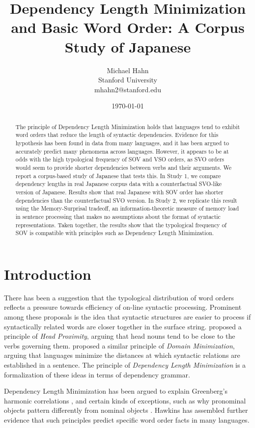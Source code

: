 \documentclass[11pt,a4paper]{article}
\title{Dependency Length Minimization and Basic Word Order: A Corpus Study of Japanese}
\author{Michael Hahn \\ Stanford University \\ mhahn2@stanford.edu}
\date{\today}
\begin{document}
\maketitle
\begin{abstract}
The principle of Dependency Length Minimization holds that languages tend to exhibit word orders that reduce the length of syntactic dependencies.
Evidence for this hypothesis has been found in data from many languages, and it has been argued to accurately predict many phenomena across languages.
However, it appears to be at odds with the high typological frequency of SOV and VSO orders, as SVO orders would seem to provide shorter dependencies between verbs and their arguments.
We report a corpus-based study of Japanese that tests this.
In Study 1, we compare dependency lengths in real Japanese corpus data with a counterfactual SVO-like version of Japanese.
Results show that real Japanese with SOV order has shorter dependencies than the counterfactual SVO version.
In Study 2, we replicate this result using the Memory-Surprisal tradeoff, an information-theoretic measure of memory load in sentence processing that makes no assumptions about the format of syntactic representations. 
Taken together, the results show that the typological frequency of SOV is compatible with principles such as Dependency Length Minimization.
\end{abstract}


\section{Introduction}

There has been a suggestion that the typological distribution of word orders reflects a pressure towards efficiency of on-line syntactic processing.
Prominent among these proposals is the idea that syntactic structures are easier to process if syntactically related words are closer together in the surface string.
\cite{rijkhoff-word-1986} proposed a principle of \emph{Head Proximity}, arguing that head nouns tend to be close to the verbs governing them.
\cite{hawkins2014crosslinguistic} proposed a similar principle of \emph{Domain Minimization}, arguing that languages minimize the distances at which syntactic relations are established in a sentence.
The principle of \emph{Dependency Length Minimization} \citep{temperley2018minimizing} is a formalization of these ideas in terms of dependency grammar.

Dependency Length Minimization has been argued to explain Greenberg's harmonic correlations \citep{rijkhoff-word-1986, hawkins1994performance}, and certain kinds of exceptions, such as why pronominal objects pattern differently from nominal objects \citep{dryer1992greenbergian}. %
Hawkins \citep{hawkins2004efficiency, hawkins2007processing, hawkins2014crosslinguistic} has assembled further evidence that such principles predict specific word order facts in many languages. %
\end{document}
